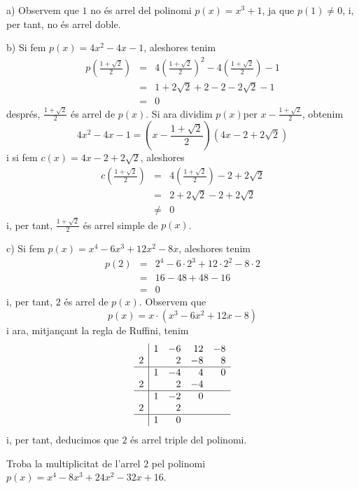 \begin{solucio}
a) Observem que $1$ no és arrel del polinomi $p(x)=x^{3}+1$, ja que $p(1)\neq 0$, i, per tant, no és arrel doble.

b) Si fem $p(x)=4x^{2}-4x-1$, aleshores tenim\begin{eqnarray*}
p\left( \frac{1+\sqrt{2}}{2}\right) &=&4\left( \frac{1+\sqrt{2}}{2}\right)
^{2}-4\left( \frac{1+\sqrt{2}}{2}\right) -1 \\
&=&1+2\sqrt{2}+2-2-2\sqrt{2}-1 \\
&=&0
\end{eqnarray*}després, $\frac{1+\sqrt{2}}{2}$ és arrel de $p(x)$. Si ara dividim $p(x) $per $x-\frac{1+\sqrt{2}}{2}$, obtenim\[
4x^{2}-4x-1=\left( x-\frac{1+\sqrt{2}}{2}\right) \left( 4x-2+2\sqrt{2}\right)
\]i si fem $c(x)=4x-2+2\sqrt{2}$, aleshores\begin{eqnarray*}
c\left( \frac{1+\sqrt{2}}{2}\right) &=&4\left( \frac{1+\sqrt{2}}{2}\right)
-2+2\sqrt{2} \\
&=&2+2\sqrt{2}-2+2\sqrt{2} \\
&\neq &0
\end{eqnarray*}i, per tant, $\frac{1+\sqrt{2}}{2}$ és arrel simple de $p(x)$.

c) Si fem $p(x)=x^{4}-6x^{3}+12x^{2}-8x$, aleshores tenim\begin{eqnarray*}
p(2) &=&2^{4}-6\cdot 2^{3}+12\cdot 2^{2}-8\cdot 2 \\
&=&16-48+48-16 \\
&=&0
\end{eqnarray*}i, per tant, $2$ és arrel de $p(x)$. Observem que\[
p(x)=x\cdot \left( x^{3}-6x^{2}+12x-8\right)
\]i ara, mitjançant la regla de Ruffini, tenim\[
\begin{array}{r|rrrr}
& 1 & -6 & 12 & -8 \\
2 & & 2 & -8 & 8 \\\hline
& 1 & -4 & 4 & 0 \\
2 & & 2 & -4 & \\\hline
& 1 & -2 & 0 & \\
2 & & 2 & & \\\hline
 & 1 & 0 & &
\end{array}\]i, per tant, deducimos que $2$ és arrel triple del polinomi.
\end{solucio}

\begin{exercici}
Troba la multiplicitat de l'arrel $2$ pel polinomi $p(x)=x^{4}-8x^{3}+24x^{2}-32x+16$.
\end{exercici}

